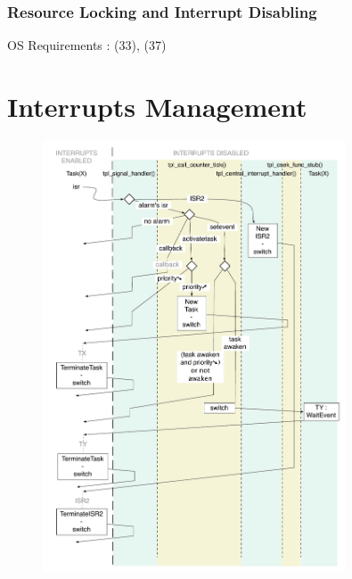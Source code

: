 \documentclass[10pt]{article}
\begin{document}
	\subsubsection{Resource Locking and Interrupt Disabling}
	OS Requirements : (33), (37)\\

	
	
	
	
	
	
	
\appendix
\section{Interrupts Management} \label{interrupts_management}
	\begin{figure}[htbp] %
   		\centering
		\includegraphics[width=0.8\textwidth]{graphics/Interrupts_Management.pdf}
	\end{figure}
	
 
 
\end{document}
